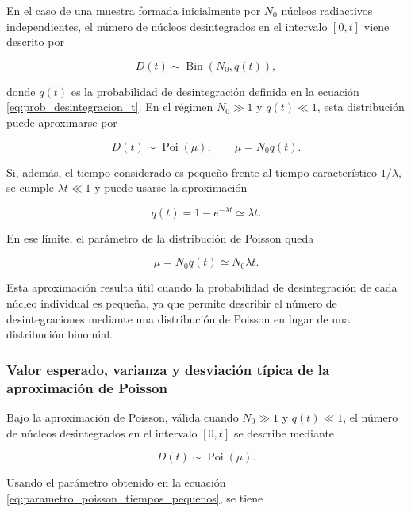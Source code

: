 \documentclass[12pt,a4paper]{article}
\begin{document}
En el caso de una muestra formada inicialmente por $N_0$ núcleos radiactivos independientes, el número de núcleos desintegrados en el intervalo $[0,t]$ viene descrito por

\begin{equation}
    D(t)\sim \operatorname{Bin}(N_0,q(t)),
\end{equation}

donde $q(t)$ es la probabilidad de desintegración definida en la ecuación \eqref{eq:prob_desintegracion_t}. En el régimen $N_0\gg 1$ y $q(t)\ll 1$, esta distribución puede aproximarse por

\begin{equation}
    D(t)\sim \operatorname{Poi}(\mu),
    \qquad
    \mu=N_0q(t).
    \label{eq:poisson_aproximacion}
\end{equation}


Si, además, el tiempo considerado es pequeño frente al tiempo característico $1/\lambda$, se cumple $\lambda t\ll 1$ y puede usarse la aproximación

\begin{equation}
    q(t)=1-e^{-\lambda t}\simeq \lambda t.
\end{equation}

En ese límite, el parámetro de la distribución de Poisson queda

\begin{equation}
    \mu=N_0q(t)\simeq N_0\lambda t.
    \label{eq:parametro_poisson_tiempos_pequenos}
\end{equation}

Esta aproximación resulta útil cuando la probabilidad de desintegración de cada núcleo individual es pequeña, ya que permite describir el número de desintegraciones mediante una distribución de Poisson en lugar de una distribución binomial.


\subsubsection{Valor esperado, varianza y desviación típica de la aproximación de Poisson}

Bajo la aproximación de Poisson, válida cuando $N_0\gg 1$ y $q(t)\ll 1$, el número de núcleos desintegrados en el intervalo $[0,t]$ se describe mediante

\begin{equation}
    D(t)\sim \operatorname{Poi}(\mu).
\end{equation}

Usando el parámetro obtenido en la ecuación \eqref{eq:parametro_poisson_tiempos_pequenos}, se tiene
\end{document}
